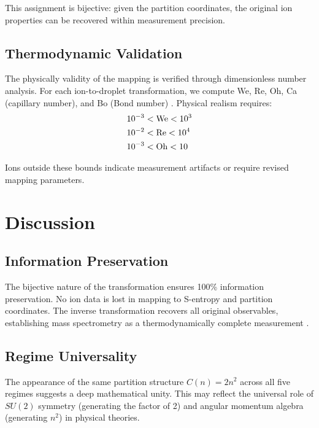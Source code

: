 This assignment is bijective: given the partition coordinates, the original ion properties can be recovered within measurement precision.

\subsection{Thermodynamic Validation}

The physically validity of the mapping is verified through dimensionless number analysis. For each ion-to-droplet transformation, we compute We, Re, Oh, Ca (capillary number), and Bo (Bond number) \cite{clift1978bubbles}. Physical realism requires:
\begin{align}
10^{-3} &< \mathrm{We} < 10^3 \\
10^{-2} &< \mathrm{Re} < 10^4 \\
10^{-3} &< \mathrm{Oh} < 10
\end{align}

Ions outside these bounds indicate measurement artifacts or require revised mapping parameters.

\section{Discussion}
\label{sec:discussion}

\subsection{Information Preservation}

The bijective nature of the transformation ensures 100\% information preservation. No ion data is lost in mapping to S-entropy and partition coordinates. The inverse transformation recovers all original observables, establishing mass spectrometry as a thermodynamically complete measurement \cite{vonneumann1955mathematical, zurek2003decoherence}.

\subsection{Regime Universality}

The appearance of the same partition structure $C(n) = 2n^2$ across all five regimes suggests a deep mathematical unity. This may reflect the universal role of $SU(2)$ symmetry (generating the factor of 2) and angular momentum algebra (generating $n^2$) in physical theories.

